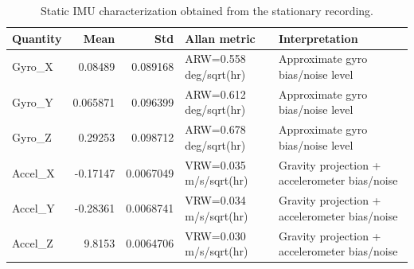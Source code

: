 \begin{table}
\caption{Static IMU characterization obtained from the stationary recording.}
\label{tab:imu_characterization}
\begin{tabular}{lrrll}
\toprule
Quantity & Mean & Std & Allan metric & Interpretation \\
\midrule
Gyro_X & 0.08489 & 0.089168 & ARW=0.558 deg/sqrt(hr) & Approximate gyro bias/noise level \\
Gyro_Y & 0.065871 & 0.096399 & ARW=0.612 deg/sqrt(hr) & Approximate gyro bias/noise level \\
Gyro_Z & 0.29253 & 0.098712 & ARW=0.678 deg/sqrt(hr) & Approximate gyro bias/noise level \\
Accel_X & -0.17147 & 0.0067049 & VRW=0.035 m/s/sqrt(hr) & Gravity projection + accelerometer bias/noise \\
Accel_Y & -0.28361 & 0.0068741 & VRW=0.034 m/s/sqrt(hr) & Gravity projection + accelerometer bias/noise \\
Accel_Z & 9.8153 & 0.0064706 & VRW=0.030 m/s/sqrt(hr) & Gravity projection + accelerometer bias/noise \\
\bottomrule
\end{tabular}
\end{table}
